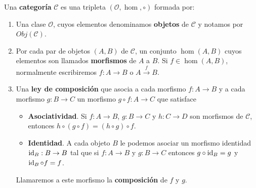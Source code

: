 \begin{definicion}
	Una \textbf{categoría} $\mathcal{C}$ es una tripleta
	$(\mathcal{O}, \hom, \circ)$ formada por:
	\begin{enumerate}
		\item Una clase $\mathcal{O}$, cuyos elementos denominamos \textbf{objetos} de
		$\mathcal{C}$ y notamos por $Obj(\mathcal{C})$.
		
		\item Por cada par de objetos $(A,B)$ de $\mathcal{C}$, un conjunto
		$\hom(A,B)$ cuyos elementos son llamados \textbf{morfismos} de $A$ a $B$.
		Si $f \in \hom(A,B)$, normalmente escribiremos $f: A \rightarrow B$ o $A \xrightarrow
		{f}B$.
		
		\item Una \textbf{ley de composición} que asocia a cada morfismo
		$f: A \rightarrow B$ y a cada morfismo $g: B \rightarrow C$ un morfismo
		$g \circ f : A \rightarrow C$ que satisface
		\begin{itemize}
			\item \textbf{Asociatividad}. Si $f: A \rightarrow B$,
			$g: B \rightarrow C$ y $h : C \rightarrow D$ son morfismos de
			$\mathcal{C}$, entonces $h \circ (g \circ f) = (h \circ g) \circ f$.
			
			\item \textbf{Identidad}. A cada objeto $B$ le podemos asociar un morfismo
			identidad $\operatorname{id}_{B}: B \rightarrow B$ tal que si $f: A \rightarrow B$ y
			$g: B \rightarrow C$ entonces $g \circ \operatorname{id}_{B}= g$ y $\operatorname{id}_{B}\circ f =
			f$.
		\end{itemize}
		Llamaremos a este morfismo la \textbf{composición} de $f$ y $g$.
	\end{enumerate}
\end{definicion}

